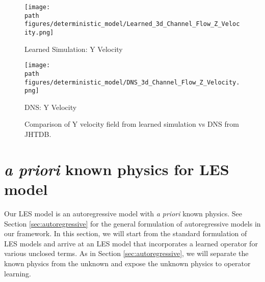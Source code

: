 \begin{figure}[H]
    \centering
    \begin{minipage}[b]{1.0\linewidth}
        \centering
        \texttt{[image: \\path figures/deterministic\_model/Learned\_3d\_Channel\_Flow\_Z\_Velocity.png]}
        \caption{Learned Simulation: Y Velocity}
    \end{minipage}
    \begin{minipage}[b]{1.0\linewidth}
        \centering
        \texttt{[image: \\path figures/deterministic\_model/DNS\_3d\_Channel\_Flow\_Z\_Velocity.png]}
        \caption{DNS: Y Velocity}
    \end{minipage}
    \caption{Comparison of Y velocity field from learned simulation vs DNS from JHTDB.}
    \label{fig:deterministic_z_velocity}
\end{figure}


\section{\textit{a priori} known physics for LES model}\label{sec:les_apriori}

Our LES model is an autoregressive model with \textit{a priori} known physics. See Section \ref{sec:autoregressive} for the general formulation of autoregressive models in our framework. In this section, we will start from the standard formulation of LES models and arrive at an LES model that incorporates a learned operator for various unclosed terms. As in Section \ref{sec:autoregressive}, we will separate the known physics from the unknown and expose the unknown physics to operator learning.

